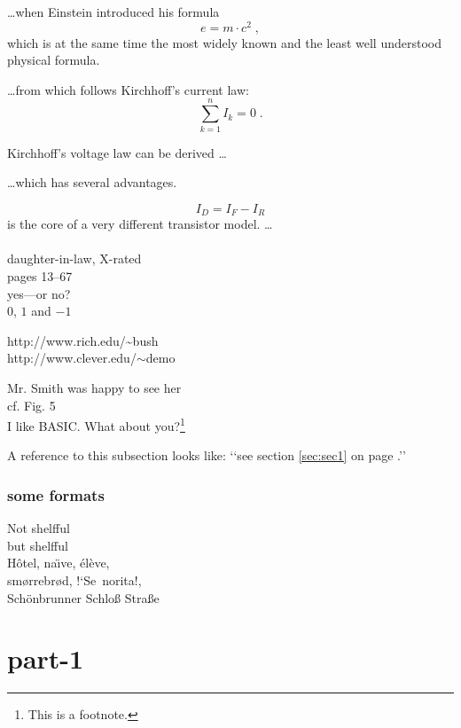 \documentclass[a4paper,11pt, twoside]{article}
\begin{document}
\ldots when Einstein introduced his formula
\begin{equation}
e = m \cdot c^2 \; ,
\end{equation}
which is at the same time the most widely known
and the least well understood physical formula.

\ldots from which follows Kirchhoff’s current law:
\begin{equation}
\sum_{k=1}^{n} I_k = 0 \; .
\end{equation}

Kirchhoff’s voltage law can be derived \ldots

\ldots which has several advantages.

\begin{equation}
I_D = I_F - I_R
\end{equation}
is the core of a very different transistor model. \ldots
\\
\\
daughter-in-law, X-rated\\
pages 13--67\\
yes---or no? \\
$0$, $1$ and $-1$

http://www.rich.edu/\~{}bush \\
http://www.clever.edu/$\sim$demo

Mr. Smith was happy to see her\\
cf. Fig. 5\\
I like BASIC\@. What about you?\footnote{This is a footnote.}

A reference to this subsection looks like:
‘‘see section \ref{sec:sec1} on
page \pageref{sec:sec1}.’’

\newpage

\section{some formats}

Not shelfful\\
but shelf\mbox{}ful
\\
H\^otel, na\"\i ve, \'el\`eve,\\
sm\o rrebr\o d, !`Se\ norita!,\\
Sch\"onbrunner Schlo\ss{}
Stra\ss e



\newpage

\part{part-1}
\end{document}
